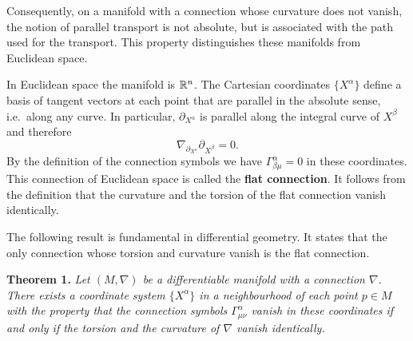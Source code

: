 \begin{points}
\item Consequently, on a manifold with a connection whose curvature does not vanish, the notion of parallel transport is not absolute, but is associated with the path used for the transport. This property distinguishes these manifolds from Euclidean space.

\item In Euclidean space the manifold is $\mathbb{R}^n$. The Cartesian coordinates $\{X^\alpha\}$ define a basis of tangent vectors at each point that are parallel in the absolute sense, i.e.\ along any curve. In particular, $\partial_{X^\alpha}$ is parallel along the integral curve of $X^\beta$ and therefore
\[
  \nabla_{\partial_{X^\alpha}}\partial_{X^\beta}=0 .
\]
By the definition of the connection symbols we have $\Gamma^\alpha_{\beta\mu}=0$ in these coordinates. This connection of Euclidean space is called the \textbf{flat connection}. It follows from the definition that the curvature and the torsion of the flat connection vanish identically.

\item The following result is fundamental in differential geometry. It states that the only connection whose torsion and curvature vanish is the flat connection.
\end{points}

\textbf{Theorem 1.} \emph{Let $(M,\nabla)$ be a differentiable manifold with a connection $\nabla$. There exists a coordinate system $\{X^\alpha\}$ in a neighbourhood of each point $p\in M$ with the property that the connection symbols $\Gamma^\alpha_{\mu\nu}$ vanish in these coordinates if and only if the torsion and the curvature of $\nabla$ vanish identically.}

